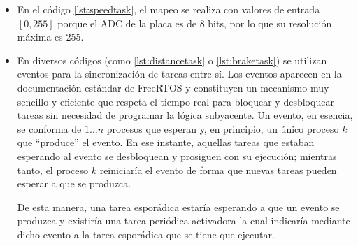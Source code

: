 \begin{itemize}
  \item En el código \ref{lst:speedtask}, el mapeo se realiza con valores
        de entrada $\left[0, 255\right]$ porque el ADC de la placa
        es de 8 bits, por lo que su resolución máxima es 255.
  \item En diversos códigos (como \ref{lst:distancetask} o \ref{lst:braketask}) se
        utilizan eventos para la sincronización de tareas entre sí. Los eventos
        aparecen en la documentación estándar de FreeRTOS y constituyen un mecanismo
        muy sencillo y eficiente que respeta el tiempo real para bloquear y desbloquear
        tareas sin necesidad de programar la lógica subyacente. Un evento, en esencia,
        se conforma de $1 \dots n$ procesos que esperan y, en principio, un único proceso
        $k$ que ``produce'' el evento. En ese instante, aquellas tareas que estaban
        esperando al evento se desbloquean y prosiguen con su ejecución; mientras tanto,
        el proceso $k$ reiniciaría el evento de forma que nuevas tareas pueden esperar
        a que se produzca.

        De esta manera, una tarea esporádica estaría esperando a que un evento se
        produzca y existiría una tarea periódica activadora la cual indicaría
        mediante dicho evento a la tarea esporádica que se tiene que ejecutar.
\end{itemize}